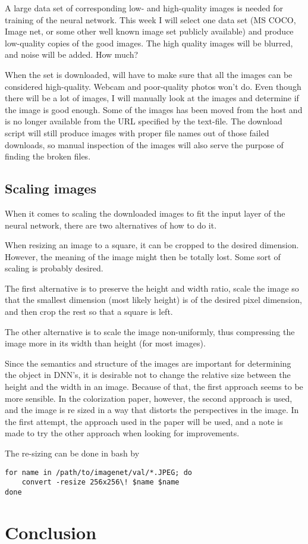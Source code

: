 \documentclass{article}
\begin{document}
A large data set of corresponding low- and high-quality images is needed for training of the neural network. This week I will select one data set (MS COCO, Image net, or some other well known image set publicly available) and produce low-quality copies of the good images. The high quality images will be blurred, and noise will be added. How much? 

When the set is downloaded, will have to make sure that all the images can be considered high-quality. Webcam and poor-quality photos won't do. Even though there will be a lot of images, I will manually look at the images and determine if the image is good enough. Some of the images has been moved from the host and is no longer available from the URL specified by the text-file. The download script will still produce images with proper file names out of those failed downloads, so manual inspection of the images will also serve the purpose of finding the broken files. 

\subsection{Scaling images}
When it comes to scaling the downloaded images to fit the input layer of the neural network, there are two alternatives of how to do it. 

When resizing an image to a square, it can be cropped to the desired dimension. However, the meaning of the image might then be totally lost. Some sort of scaling is probably desired. 

The first alternative is to preserve the height and width ratio, scale the image so that the smallest dimension (most likely height) is of the desired pixel dimension, and then crop the rest so that a square is left. 

The other alternative is to scale the image non-uniformly, thus compressing the image more in its width than height (for most images). 

Since the semantics and structure of the images are important for determining the object in DNN's, it is desirable not to change the relative size between the height and the width in an image. Because of that, the first approach seems to be more sensible. In the colorization paper, however, the second approach is used, and the image is re sized in a way that distorts the perspectives in the image. In the first attempt, the approach used in the paper will be used, and a note is made to try the other approach when looking for improvements. 

The re-sizing can be done in bash by

\begin{lstlisting}
for name in /path/to/imagenet/val/*.JPEG; do
    convert -resize 256x256\! $name $name
done
\end{lstlisting}

\section{Conclusion}




\end{document}
